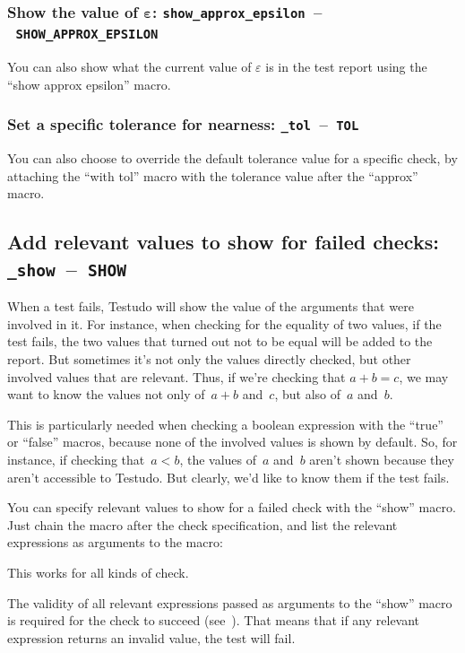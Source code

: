 \documentclass[twoside, a4paper, article]{memoir}
\newcommand*\testudocolor{\color{red!80!blue}}
\newcommand*\testudo[1]{\texttt{\testudocolor{}#1}}
\newcommand*\testudopair[2]{\testudo{#1}~--~\testudo{#2}}
\newcommand\subsectiontestudopair[3]{%
  \subsection[#1]{#1: \testudopair{#2}{#3}}}
\newcommand\subsubsectiontestudopair[3]{%
  \subsubsection[#1]{#1: \testudopair{#2}{#3}}}
\newcommand\typesetexampleandreport[1]{%
  \typesetexamplesource{#1}
  \typesetexamplereport{#1}
}
\providecommand\typesetexamplereport[1]{%
}
\providecommand\typesetexamplesource[1]{%
}
\begin{document}
\typesetexampleandreport{set-approx-epsilon}

\subsubsectiontestudopair{Show the value of $\bm{\varepsilon}$}%
  {show\_approx\_epsilon}{SHOW\_APPROX\_EPSILON}
\label{sec:show-value-epsilon}

You can also show what the current value of $\varepsilon$ is in the test
report using the ``show approx epsilon'' macro.

\typesetexampleandreport{show-approx-epsilon}

\subsubsectiontestudopair{Set a specific tolerance for nearness}%
  {\_tol}{TOL}
\label{sec:specify-tolerance-nearness}

You can also choose to override the default tolerance value for a specific
check, by attaching the ``with tol'' macro with the tolerance value after the
``approx'' macro.

\typesetexampleandreport{check-approx-tol}

\subsectiontestudopair{Add relevant values to show for failed checks}%
  {\_show}{SHOW}
\label{sec:check-show-relevant-values}

When a test fails, Testudo will show the value of the arguments that were
involved in it.  For instance, when checking for the equality of two values, if
the test fails, the two values that turned out not to be equal will be added to
the report.  But sometimes it's not only the values directly checked, but other
involved values that are relevant.  Thus, if we're checking that $a+b=c$, we
may want to know the values not only of~$a+b$ and~$c$, but also of~$a$ and~$b$.

This is particularly needed when checking a boolean expression with the
``true'' or ``false'' macros, because none of the involved values is shown by
default.  So, for instance, if checking that~$a<b$, the values of~$a$ and~$b$
aren't shown because they aren't accessible to Testudo.  But clearly, we'd like
to know them if the test fails.

You can specify relevant values to show for a failed check with the ``show''
macro.  Just chain the macro after the check specification, and list the
relevant expressions as arguments to the macro:

\typesetexampleandreport{check-show}

This works for all kinds of check.

\typesetexampleandreport{check-show-other}

The validity of all relevant expressions passed as arguments to the ``show''
macro is required for the check to succeed (see~).
That means that if any relevant expression returns an invalid value, the test
will fail.
\end{document}
